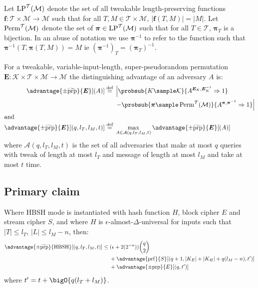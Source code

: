 \documentclass[eprint.tex]{subfiles}
\begin{document}
Let $\operatorname{LP}^\mathcal{T}(\mathcal{M})$ denote the set of all
tweakable length-preserving functions
$\bm{f} : \mathcal{T} \times \mathcal{M} \rightarrow \mathcal{M}$
such that for all $T, M \in \mathcal{T} \times \mathcal{M}$,
$|\bm{f}(T, M)| = |M|$. Let $\operatorname{Perm}^\mathcal{T}(\mathcal{M})$ denote
the set of $\bm{\pi} \in \operatorname{LP}^\mathcal{T}(\mathcal{M})$ such that
for all $T \in \mathcal{T}$, $\bm{\pi}_{T}$ is a bijection.
In an abuse of notation
we use $\bm{\pi}^{-1}$ to refer to the function
such that $\bm{\pi}^{-1}(T, \bm{\pi}(T, M)) = M$ ie $(\bm{\pi}^{-1})_T = (\bm{\pi}_T)^{-1}$.

For a tweakable, variable-input-length, super-pseudorandom permutation
$\bm{E} : \mathcal{K} \times \mathcal{T} \times \mathcal{M} \rightarrow \mathcal{M}$
the distinguishing advantage of an adversary $A$ is:
%
\begin{align*}
    \advantage{\pm \widetilde{\mathrm{prp}}}{\bm{E}}[(A)] \defeq
    {}&\left\lvert\probsub{K \sample \mathcal{K}}{A^{\bm{E}_K,\bm{E}_K^{-1}}\Rightarrow 1}\right.
    \\
    {}&\left. - \probsub{\bm{\pi} \sample \Perm^\mathcal{T}(\mathcal{M})}
        {A^{\bm{\pi},\bm{\pi}^{-1}}\Rightarrow 1}\right\rvert
    \\
    \intertext{and}
    \advantage{\pm \widetilde{\mathrm{prp}}}{\bm{E}}[(q, l_T, l_M, t)]
    \defeq {}&
    \max_{A \in \mathcal{A}(q, l_T, l_M, t)} \advantage{\pm \widetilde{\mathrm{prp}}}{\bm{E}}[(A)]
\end{align*}
%
\begin{displaymath}
\end{displaymath}
where $\mathcal{A}(q, l_T, l_M, t)$
is the set of all adversaries that
make at most $q$ queries
with tweak of length at most $l_T$
and message of length at most $l_M$
and take at most $t$ time.

\subsection{Primary claim}
\begin{theorem}\label{hbshadvantage}
    Where HBSH mode is instantiated with hash function $H$, block cipher $E$ and stream cipher $S$,
    and where $H$ is $\epsilon$-almost-$\Delta$-universal for inputs such that
    $|T| \leq l_T$, $|L| \leq l_M - n$, then:
    \begin{align*}
        \advantage{\pm \widetilde{\mathrm{prp}}}{\HBSH}[(q, l_T, l_M, t)]
        \leq {}&(\epsilon + 2(2^{-n}))\binom{q}{2} \\
        {}&+ \advantage{\mathrm{prf}}{S}[(q + 1, |K_E| + |K_H| + q(l_M - n), t')] \\
        {}&+ \advantage{\pm \mathrm{prp}}{E}[(q, t')]\\
    \end{align*}
    where $t' = t + \bigO{q(l_T + l_M)}$.
\end{theorem}
\end{document}
